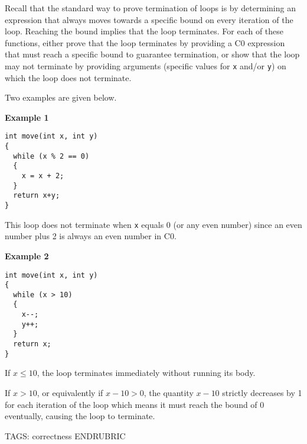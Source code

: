 \clearpage
{}

Recall that the standard way to prove termination of loops is by
determining an expression that always moves towards a specific bound
on every iteration of the loop. Reaching the bound implies that the
loop terminates.  For each of these functions, either prove that the
loop terminates by providing a C0 expression that must reach a
specific bound to guarantee termination, or show that the loop may not
terminate by providing arguments (specific values for \lstinline'x' and/or
\lstinline'y') on which the loop does not terminate.

Two examples are given below.

\textbf{Example 1}

\begin{lstlisting}
int move(int x, int y)
{
  while (x % 2 == 0)
  {
    x = x + 2;
  }
  return x+y;
}
\end{lstlisting}
This loop does not terminate when \lstinline'x' equals 0 (or any even
number) since an even number plus 2 is always an even number in C0.

\bigskip
\textbf{Example 2}

\begin{lstlisting}
int move(int x, int y)
{
  while (x > 10)
  {
    x--;
    y++;
  }
  return x;
}
\end{lstlisting}
If $x \leq 10$, the loop terminates immediately without running its body.

If $x > 10$, or equivalently if $x-10 > 0$, the quantity $x - 10$
strictly decreases by 1 for each iteration of the loop which means it
must reach the bound of 0 eventually, causing the loop to terminate.

\newpage

\begin{parts}
\RUBRIC
TAGS: correctness
ENDRUBRIC



\end{parts}
